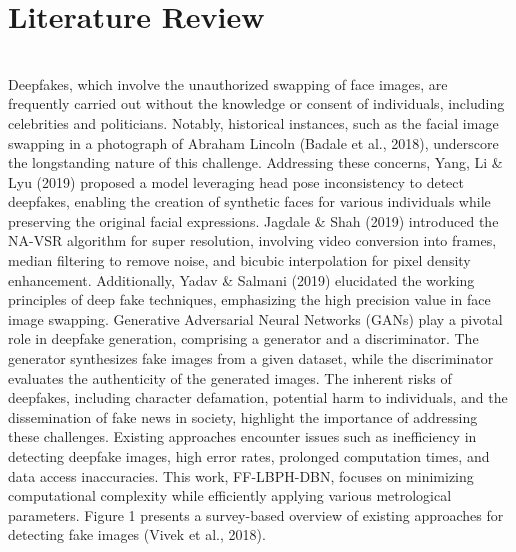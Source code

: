 \chapter{Literature Review}
\\
Deepfakes, which involve the unauthorized swapping of face images, are frequently carried out without the knowledge or consent of individuals, including celebrities and politicians. Notably, historical instances, such as the facial image swapping in a photograph of Abraham Lincoln (Badale et al., 2018), underscore the longstanding nature of this challenge. Addressing these concerns, Yang, Li \& Lyu (2019) proposed a model leveraging head pose inconsistency to detect deepfakes, enabling the creation of synthetic faces for various individuals while preserving the original facial expressions.
Jagdale \& Shah (2019) introduced the NA-VSR algorithm for super resolution, involving video conversion into frames, median filtering to remove noise, and bicubic interpolation for pixel density enhancement. Additionally, Yadav \& Salmani (2019) elucidated the working principles of deep fake techniques, emphasizing the high precision value in face image swapping.
Generative Adversarial Neural Networks (GANs) play a pivotal role in deepfake generation, comprising a generator and a discriminator. The generator synthesizes fake images from a given dataset, while the discriminator evaluates the authenticity of the generated images. The inherent risks of deepfakes, including character defamation, potential harm to individuals, and the dissemination of fake news in society, highlight the importance of addressing these challenges.
Existing approaches encounter issues such as inefficiency in detecting deepfake images, high error rates, prolonged computation times, and data access inaccuracies. This work, FF-LBPH-DBN, focuses on minimizing computational complexity while efficiently applying various metrological parameters. Figure 1 presents a survey-based overview of existing approaches for detecting fake images (Vivek et al., 2018).

